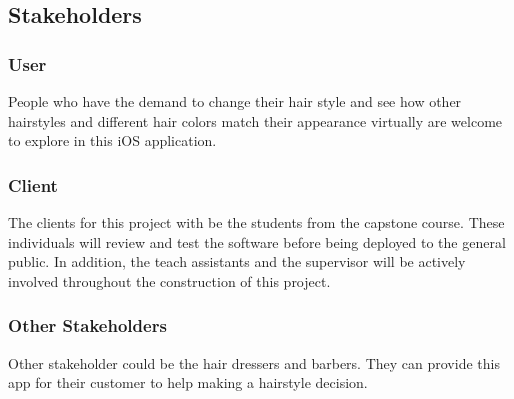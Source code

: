 \documentclass[12pt]{article}
\begin{document}
\subsection{Stakeholders}
\subsubsection{User}
\item People who have the demand to change their hair style and see how other hairstyles and different hair colors match their appearance virtually are welcome to explore in this iOS application.

\subsubsection{Client}

The clients for this project with be the students from the capstone course. These individuals will review and test the software before being deployed to the general public. In addition, the teach assistants and the supervisor will be actively involved throughout
the construction of this project.

\subsubsection{Other Stakeholders}
Other stakeholder could be the hair dressers and barbers. They can provide this app for their customer to help making a hairstyle decision.
\end{document}
